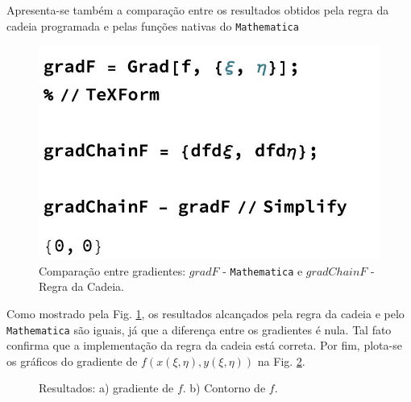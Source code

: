 Apresenta-se tamb\'em a compara\c{c}\~ao entre os resultados obtidos pela regra da cadeia programada e pelas fun\c{c}\~oes nativas do \texttt{Mathematica}

\begin{figure}[H]
    \centering
    \includegraphics[scale=.22]{Figures/Ex3Comparison.jpeg}
    \caption{Compara\c{c}\~ao entre gradientes: $gradF$ - \texttt{Mathematica} e $gradChainF$ - Regra da Cadeia.}
    \label{fig:gradf}
\end{figure}

Como mostrado pela Fig. \ref{fig:gradf}, os resultados alcan\c{c}ados pela regra da cadeia e pelo \texttt{Mathematica} s\~ao iguais, j\'a que a diferen\c{c}a entre os gradientes \'e nula. Tal fato confirma que a implementa\c{c}\~ao da regra da cadeia est\'a correta. Por fim, plota-se os gr\'aficos do gradiente de $f(x(\xi, \eta), y(\xi, \eta))$ na Fig. \ref{fig:gradfplot}.

\begin{figure}[H]
    \centering
    \hfill
    \caption{Resultados: a) gradiente de $f$. b) Contorno de $f$.}
    \label{fig:gradfplot}
\end{figure}